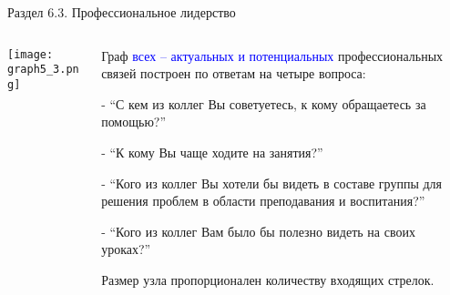 \begin{frame}{Раздел 6.3. Профессиональное лидерство}


\begin{columns}
\begin{column}{0.75\textwidth} 
\centering
          \texttt{[image: graph5\_3.png]}
\end{column}
\begin{column}{0.25\textwidth} %

\tiny
Граф \textcolor{blue}{всех -- актуальных и потенциальных} профессиональных связей построен по ответам на четыре вопроса:
\smallskip

- ``С кем из коллег Вы советуетесь, к кому обращаетесь за помощью?''
\smallskip

- ``К кому Вы чаще ходите на занятия?''
\smallskip

- ``Кого из коллег Вы хотели бы видеть в составе группы для решения проблем в области преподавания и воспитания?''
\smallskip

- ``Кого из коллег Вам было бы полезно видеть на своих уроках?''
\smallskip

Размер узла пропорционален количеству входящих стрелок.
\end{column}
\end{columns}
\end{frame}


